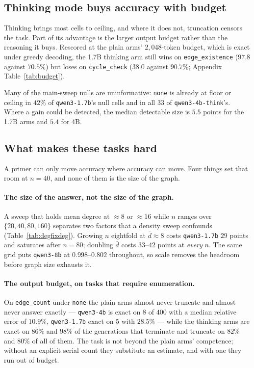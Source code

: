 \documentclass[11pt]{article}
\begin{document}
\subsection{Thinking mode buys accuracy with budget}
\label{sec:results-thinking}
\label{sec:results-power}

Thinking brings most cells to ceiling, and where it does not, truncation
censors the task. Part of its advantage is the larger output budget rather
than the reasoning it buys. Rescored at the plain arms' $2{,}048$-token
budget, which is exact under greedy decoding, the 1.7B thinking arm still
wins on \texttt{edge\_existence} ($97.8$ against $70.5\%$) but loses on
\texttt{cycle\_check} ($38.0$ against $90.7\%$; Appendix
Table~\ref{tab:budget}).

Many of the main-sweep nulls are uninformative: \texttt{none} is already at
floor or ceiling in $42\%$ of \texttt{qwen3-1.7b}'s null cells and in all
$33$ of \texttt{qwen3-4b-think}'s. Where a gain could be detected, the
median detectable size is $5.5$ points for the 1.7B arms and $5.4$ for 4B.

\subsection{What makes these tasks hard}
\label{sec:results-difficulty}

A primer can only move accuracy where accuracy can move. Four things set
that room at $n{=}40$, and none of them is the size of the graph.



\paragraph{The size of the answer, not the size of the graph.} A sweep that
holds mean degree at $\approx 8$ or $\approx 16$ while $n$ ranges over
$\{20,40,80,160\}$ separates two factors that a density sweep confounds
(Table~\ref{tab:degfixdeg}). Growing $n$ eightfold at $\bar{d}{\approx}8$
costs \texttt{qwen3-1.7b} $29$ points and saturates after $n{=}80$;
doubling $\bar{d}$ costs $33$--$42$ points at \emph{every} $n$. The same
grid puts \texttt{qwen3-8b} at $0.998$--$0.802$ throughout, so scale
removes the headroom before graph size exhausts it.

\paragraph{The output budget, on tasks that require enumeration.} On
\texttt{edge\_count} under \texttt{none} the plain arms almost never
truncate and almost never answer exactly --- \texttt{qwen3-4b} is exact on
$8$ of $400$ with a median relative error of $10.9\%$, \texttt{qwen3-1.7b}
exact on $5$ with $28.5\%$ --- while the thinking arms are exact on $86\%$
and $98\%$ of the generations that terminate and truncate on $82\%$ and
$80\%$ of all of them. The task is not beyond the plain arms' competence;
without an explicit serial count they substitute an estimate, and with one
they run out of budget.
\end{document}
